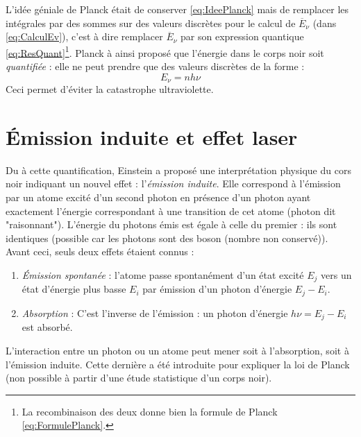 \documentclass	[11pt, a4paper, openany]{book}
\begin{document}
L'idée géniale de Planck était de conserver \autoref{eq:IdeePlanck} mais de remplacer les intégrales par
des sommes sur des valeurs discrètes pour le calcul de $\overline{E}_\nu$ (dans \autoref{eq:CalculEv}), 
c'est à dire remplacer $\overline{E}_\nu$ par son expression quantique \autoref{eq:ResQuant}\footnote{La 
recombinaison des deux donne bien la formule de Planck \autoref{eq:FormulePlanck}.}. Planck à ainsi proposé 
que l'énergie dans le corps noir soit \textit{quantifiée} : elle ne peut prendre que des valeurs discrètes 
de la forme :
\begin{equation}
E_\nu = nh\nu
\end{equation}
Ceci permet d'éviter la catastrophe ultraviolette.


\section{Émission induite et effet laser}
Du à cette quantification, Einstein a proposé une interprétation physique du cors noir indiquant un nouvel 
effet : l'\textit{émission induite}. Elle correspond à l'émission par un atome excité d'un second photon en 
présence d'un photon ayant exactement l'énergie correspondant à une transition de cet atome (photon dit 
"raisonnant"). L'énergie du photons émis est égale à celle du premier : ils sont identiques (possible car les
photons sont des boson (nombre non conservé)). Avant ceci, seuls deux effets étaient connus :
\begin{enumerate}
\item \textit{Émission spontanée} : l'atome passe spontanément d'un état excité $E_j$ vers un état d'énergie
plus basse $E_i$ par émission d'un photon d'énergie $E_j-E_i$.
\item \textit{Absorption} : C'est l'inverse de l'émission : un photon d'énergie $h\nu = E_j-E_i$ est 
absorbé.
\end{enumerate}
L'interaction entre un photon ou un atome peut mener soit à l'absorption, soit à l'émission induite. Cette 
dernière a été introduite pour expliquer la loi de Planck (non possible à partir d'une étude statistique d'un
corps noir).
\end{document}
